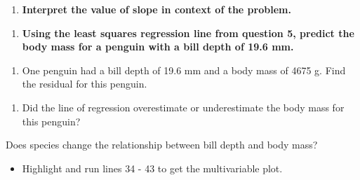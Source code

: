 \documentclass[
]{report}
\providecommand{\tightlist}{%
  \setlength{\itemsep}{0pt}\setlength{\parskip}{0pt}}
\begin{document}
\vspace{.5in}

\begin{enumerate}
\def\labelenumi{\arabic{enumi}.}
\setcounter{enumi}{5}
\tightlist
\item
  \textbf{Interpret the value of slope in context of the problem.}
\end{enumerate}

\vspace{.8in}

\begin{enumerate}
\def\labelenumi{\arabic{enumi}.}
\setcounter{enumi}{6}
\tightlist
\item
  \textbf{Using the least squares regression line from question 5, predict the body mass for a penguin with a bill depth of 19.6 mm.}
\end{enumerate}

\vspace{.6in}

\begin{enumerate}
\def\labelenumi{\arabic{enumi}.}
\setcounter{enumi}{7}
\tightlist
\item
  One penguin had a bill depth of 19.6 mm and a body mass of 4675 g. Find the residual for this penguin.
\end{enumerate}

\vspace{.8in}

\begin{enumerate}
\def\labelenumi{\arabic{enumi}.}
\setcounter{enumi}{8}
\tightlist
\item
  Did the line of regression overestimate or underestimate the body mass for this penguin?
\end{enumerate}

\vspace{0.2in}

Does species change the relationship between bill depth and body mass?

\begin{itemize}
\tightlist
\item
  Highlight and run lines 34 - 43 to get the multivariable plot.
\end{itemize}
\end{document}
